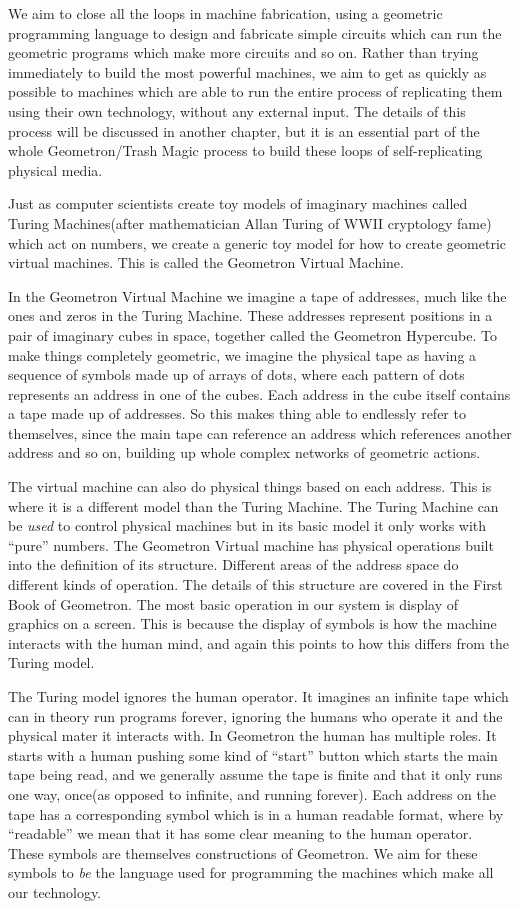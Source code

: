 We aim to close all the loops in machine fabrication, using a geometric
programming language to design and fabricate simple circuits which can
run the geometric programs which make more circuits and so on. Rather
than trying immediately to build the most powerful machines, we aim to
get as quickly as possible to machines which are able to run the entire
process of replicating them using their own technology, without any
external input. The details of this process will be discussed in another
chapter, but it is an essential part of the whole Geometron/Trash Magic
process to build these loops of self-replicating physical media.

Just as computer scientists create toy models of imaginary machines
called Turing Machines(after mathematician Allan Turing of WWII
cryptology fame) which act on numbers, we create a generic toy model for
how to create geometric virtual machines. This is called the Geometron
Virtual Machine.

In the Geometron Virtual Machine we imagine a tape of addresses, much
like the ones and zeros in the Turing Machine. These addresses represent
positions in a pair of imaginary cubes in space, together called the
Geometron Hypercube. To make things completely geometric, we imagine the
physical tape as having a sequence of symbols made up of arrays of dots,
where each pattern of dots represents an address in one of the cubes.
Each address in the cube itself contains a tape made up of addresses. So
this makes thing able to endlessly refer to themselves, since the main
tape can reference an address which references another address and so
on, building up whole complex networks of geometric actions.

The virtual machine can also do physical things based on each address.
This is where it is a different model than the Turing Machine. The
Turing Machine can be \emph{used} to control physical machines but in
its basic model it only works with ``pure'' numbers. The Geometron
Virtual machine has physical operations built into the definition of its
structure. Different areas of the address space do different kinds of
operation. The details of this structure are covered in the First Book
of Geometron. The most basic operation in our system is display of
graphics on a screen. This is because the display of symbols is how the
machine interacts with the human mind, and again this points to how this
differs from the Turing model.

The Turing model ignores the human operator. It imagines an infinite
tape which can in theory run programs forever, ignoring the humans who
operate it and the physical mater it interacts with. In Geometron the
human has multiple roles. It starts with a human pushing some kind of
``start'' button which starts the main tape being read, and we generally
assume the tape is finite and that it only runs one way, once(as opposed
to infinite, and running forever). Each address on the tape has a
corresponding symbol which is in a human readable format, where by
``readable'' we mean that it has some clear meaning to the human
operator. These symbols are themselves constructions of Geometron. We
aim for these symbols to \emph{be} the language used for programming the
machines which make all our technology.

